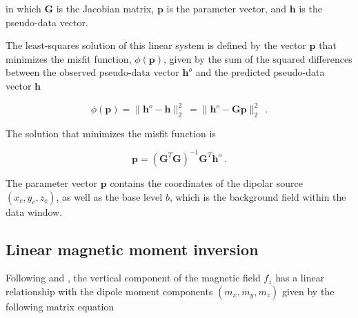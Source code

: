 \documentclass[onecolumn,12pt,a4paper]{article}
\begin{document}
    \noindent
    in which $\mathbf{G}$ is the Jacobian matrix, $\mathbf{p}$ is the parameter vector, and $\mathbf{h}$ is the pseudo-data vector.

    The least-squares solution of this linear system is defined by the vector $\mathbf{p}$ that minimizes the misfit function, $\phi(\mathbf{p})$, given by the sum of the squared differences between the observed pseudo-data vector $\mathbf{h}^o$ and the predicted pseudo-data vector $\mathbf{h}$

    \begin{equation}
    \label{function_phi}
    \phi(\mathbf{p}) 
    = \| \mathbf{h}^o - \mathbf{h} \|_2^2\ 
    = \| \mathbf{h}^o - \mathbf{G}\mathbf{p} \|_2^2\
    \ .
    \end{equation}

    \noindent
    The solution that minimizes the misfit function is

    \begin{equation}
    \label{euler_solution}
    \mathbf{p} = \left(\mathbf{G}^T \mathbf{G}\right)^{-1} \mathbf{G}^T \mathbf{h}^o\ .
    \end{equation}

    \noindent
    The parameter vector $\mathbf{p}$ contains the coordinates of the dipolar source $(x_c, y_c, z_c)$, as well as the base level $b$, which is the background field within the data window.

\subsection{Linear magnetic moment inversion}

     Following \citet{Oliveira2015Estimation} and \citet{Souza-Junior2024}, the vertical component of the magnetic field $f_z$ has a linear relationship with the dipole moment components $(m_x, m_y, m_z)$ given by the following matrix equation
\end{document}
